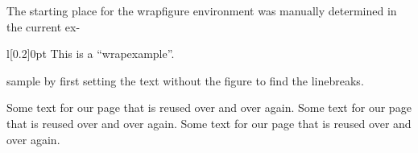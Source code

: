 \documentclass{tlc2/ttctexa}
\newcommand\sample{Some text for our page
 that is reused over and over again. }
\begin{document}
The starting place for the wrapfigure
environment was manually determined in
the current ex-
\begin{wrapExample}[7]{l}[0.2\width]{0pt}
  \centering
  This is a ``wrapexample''.
  \caption{An example of the
    \texttt{wrapexample} environment}
\end{wrapExample}
sample by first setting the text without
the figure to find the linebreaks.

\sample \sample \sample
\end{document}
